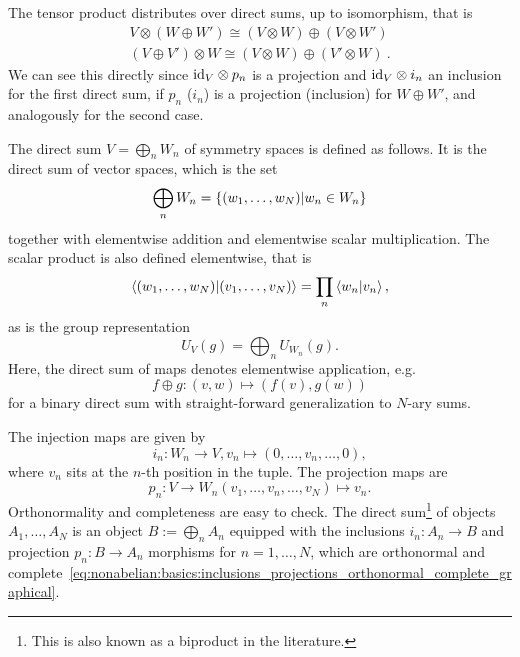 The tensor product distributes over direct sums, up to isomorphism, that is 
\begin{align}
    \label{eq:nonabelian:basics:oplus_compatible_otimes}
    V \otimes (W \oplus W') \cong (V \otimes W) \oplus (V \otimes W')
    \\
    (V \oplus V') \otimes W \cong (V \otimes W) \oplus (V' \otimes W)
    ~.
\end{align}
%
We can see this directly since $\mathrm{id}_{V} \otimes p_n$ is a projection and $\mathrm{id}_{V} \otimes i_n$ an inclusion for the first direct sum, if $p_n$ ($i_n$) is a projection (inclusion) for $W \oplus W'$, and analogously for the second case.
\clearpage
\begin{doublecol}
    The direct sum $V = \bigoplus_n W_n$ of symmetry spaces is defined as follows.
    It is the direct sum of vector spaces, which is the set 
    \begin{equation*}
        \bigoplus_n W_n = \setdef{(w_1, \dots, w_N)}{w_n \in W_n}
    \end{equation*}
    together with elementwise addition and elementwise scalar multiplication.
    The scalar product is also defined elementwise, that is 
    \begin{equation*}
        \braket{(w_1, \dots, w_N)}{(v_1, \dots, v_N)} = \prod_n \braket{w_n}{v_n}
        ,
    \end{equation*}
    as is the group representation
    \begin{equation*}
        U_V(g) = \bigoplus_n U_{W_n}(g)
        .
    \end{equation*}
    Here, the direct sum of maps denotes elementwise application, e.g.
    \begin{equation*}
        f \oplus g : (v, w) \mapsto (f(v), g(w))
    \end{equation*}
    for a binary direct sum with straight-for\-ward generalization to $N$-ary sums.

    The injection maps are given by $$i_n : W_n \to V, v_n \mapsto (0, \dots, v_n, \dots, 0),$$ where $v_n$ sits at the $n$-th position in the tuple.
    The projection maps are $$p_n: V \to W_n (v_1, \dots, v_n, \dots, v_N) \mapsto v_n.$$
    Orthonormality and completeness are easy to check.
\colswitch
    The direct sum\footnote{
        This is also known as a biproduct in the literature.
    } of objects $A_1, \dots, A_N$ is an object $B := \bigoplus_n A_n$ equipped with the inclusions $i_n : A_n \to B$ and projection $p_n : B \to A_n$ morphisms for $n=1,\dots,N$, which are orthonormal and complete~\eqref{eq:nonabelian:basics:inclusions_projections_orthonormal_complete_graphical}.
    

\end{doublecol}
